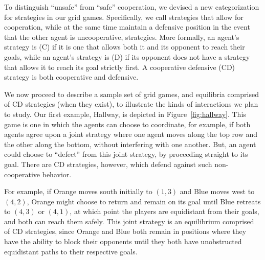 To distinguish ``unsafe'' from ``safe'' cooperation, we devised a new
categorization for strategies in our grid games.  Specifically, we
call strategies that allow for cooperation, while at the same time
maintain a defensive position in the event that the other agent is
uncooperative,  strategies.  More
formally, an agent's strategy is  (C) if it is one
that allows both it and its opponent to reach their goals, while an
agent's strategy is  (D) if its opponent does not
have a strategy that allows it to reach its goal strictly first.  A
cooperative defensive (CD) strategy is both cooperative and defensive.

We now proceed to describe a sample set of grid games, and equilibria
comprised of CD strategies (when they exist), to illustrate the kinds
of interactions we plan to study.
%
Our first example, Hallway, is depicted in Figure~\ref{fig:hallway}.
This game is one in which the agents can choose to coordinate, for
example, if both agents agree upon a joint strategy where one agent
moves along the top row and the other along the bottom, without
interfering with one another.  But, an agent could choose to ``defect''
from this joint strategy, by proceeding straight to its goal.  There
are CD strategies, however, which defend against such non-cooperative
behavior.

For example, if Orange moves south initially to $(1,3)$ and Blue moves
west to $(4,2)$, Orange might choose to return and remain on its goal
until Blue retreats to $(4,3)$ or $(4,1)$, at which point the players
are equidistant from their goals, and both can reach them safely.
This joint strategy is an equilibrium comprised of CD strategies,
since Orange and Blue both remain in positions where they have the
ability to block their opponents until they both have unobstructed
equidistant paths to their respective goals.


